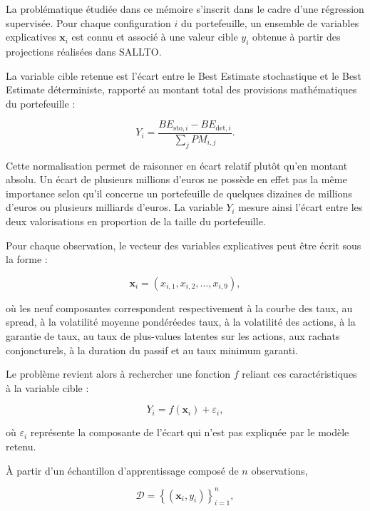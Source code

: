La problématique étudiée dans ce mémoire s'inscrit dans le cadre d'une régression supervisée. Pour chaque configuration $i$ du portefeuille, un ensemble de variables explicatives $\mathbf{x}_i$ est connu et associé à une valeur cible $y_i$ obtenue à partir des projections réalisées dans SALLTO.

La variable cible retenue est l'écart entre le Best Estimate stochastique et le Best Estimate déterministe, rapporté au montant total des provisions mathématiques du portefeuille :

\begin{equation}
    Y_i =
    \frac{
        BE_{\mathrm{sto},i} - BE_{\mathrm{det},i}
    }{
        \sum_j PM_{i,j}
    }.
    \label{eq:target_ml}
\end{equation}

Cette normalisation permet de raisonner en écart relatif plutôt qu'en montant absolu. Un écart de plusieurs millions d'euros ne possède en effet pas la même importance selon qu'il concerne un portefeuille de quelques dizaines de millions d'euros ou plusieurs milliards d'euros. La variable $Y_i$ mesure ainsi l'écart entre les deux valorisations en proportion de la taille du portefeuille.

Pour chaque observation, le vecteur des variables explicatives peut être écrit sous la forme :

\begin{equation}
\mathbf{x}_i =
\left(
x_{i,1},
x_{i,2},
\ldots,
x_{i,9}
\right),
\end{equation}

où les neuf composantes correspondent respectivement à la courbe des taux, au spread, à la volatilité moyenne pondéréedes taux, à la volatilité des actions, à la garantie de taux, au taux de plus-values latentes sur les actions, aux rachats conjoncturels, à la duration du passif et au taux minimum garanti.

Le problème revient alors à rechercher une fonction $f$ reliant ces caractéristiques à la variable cible :

\begin{equation}
    Y_i = f(\mathbf{x}_i) + \varepsilon_i,
\end{equation}

où $\varepsilon_i$ représente la composante de l'écart qui n'est pas expliquée par le modèle retenu.

À partir d'un échantillon d'apprentissage composé de $n$ observations,

\begin{equation}
    \mathcal{D}
    =
    \left\{
    \left(\mathbf{x}_i,y_i\right)
    \right\}_{i=1}^{n},
\end{equation}


